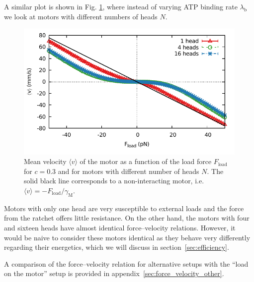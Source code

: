 \documentclass[aps,pre,twocolumn,showpacs,showkeys,superscriptaddress,floatfix]{revtex4-1}
\begin{document}
A similar plot is shown in Fig. \ref{fig:F_v_heads}, where instead of varying ATP binding rate $\lambda_\text{b}$ we look at motors with different numbers of heads $N$. 
\begin{figure}[t]
\centering
\includegraphics[width=0.9\linewidth,height=!]{F_v_heads}
\caption{
\label{fig:F_v_heads} 
Mean velocity $\langle v \rangle$ of the motor as a function of the load force $F_\text{load}$ for $c=0.3$ and for motors with different number of heads $N$.
The solid black line corresponds to a non-interacting motor, i.e. $\langle v \rangle = - F_\text{load} / \gamma_\text{M}$. 
}
\end{figure}
Motors with only one head are very susceptible to external loads and the force from the ratchet offers little resistance. 
On the other hand, the motors with four and sixteen heads have almost identical force--velocity relations. 
However, it would be naive to consider these motors identical as they behave very differently regarding their energetics,  
which we will discuss in section~\ref{sec:efficiency}.

A comparison of the force--velocity relation for alternative setups with the ``load on the motor'' setup is provided in appendix~\ref{sec:force_velocity_other}.
\end{document}
